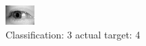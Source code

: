 \begin{figure}[h!]
\begin{center}
\includegraphics[width=0.60\columnwidth]{figures/ID3214_class_3_target_4.png}
\end{center}
\caption{ Classification: 3 actual target: 4}
\label{fig:ID3214_class_3_target_4}
\end{figure}
